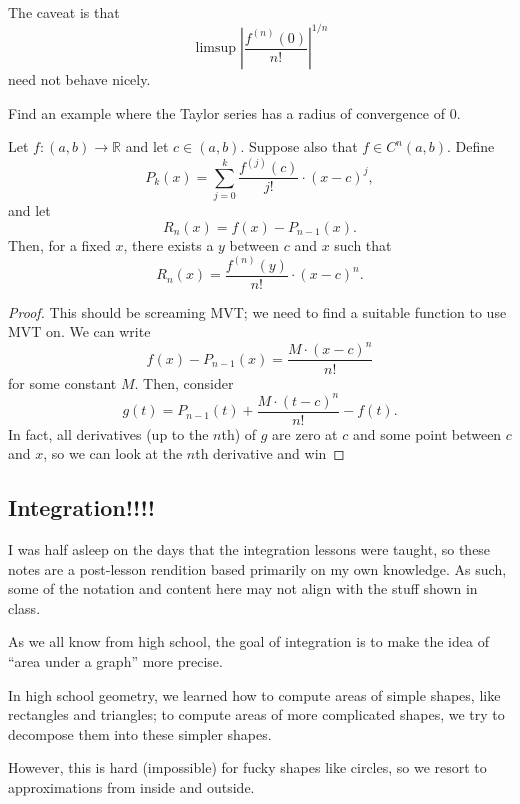 \documentclass[10pt]{scrartcl}
\providecommand{\RR}{\mathbb R}
\providecommand{\abs}[1]{\left|{#1}\right|}
\begin{document}
The caveat is that
\[\limsup\abs{\frac{f^{(n)}(0)}{n!}}^{1/n}\]
need not behave nicely.

\begin{exercise}
	Find an example where the Taylor series
	has a radius of convergence of $0$.
\end{exercise}

\begin{lemma}
	Let $f\colon(a, b)\to\RR$ and let $c\in(a, b)$.
	Suppose also that $f\in C^n(a, b)$. Define
	\[P_k(x) = \sum_{j=0}^k \frac{f^{(j)}(c)}{j!}\cdot (x-c)^j,\]
	and let
	\[R_n(x) = f(x) - P_{n-1}(x).\]
	Then, for a fixed $x$, there exists a $y$ between $c$ and $x$ such that
	\[R_n(x) = \frac{f^{(n)}(y)}{n!}\cdot (x-c)^n.\]
\end{lemma}

\begin{proof}
	This should be screaming MVT; we need to find
	a suitable function to use MVT on.
	We can write
	\[f(x) - P_{n-1}(x) = \frac{M\cdot (x-c)^n}{n!}\]
	for some constant $M$. Then, consider
	\[g(t) = P_{n-1}(t) + \frac{M\cdot(t-c)^n}{n!} - f(t).\]
	In fact, all derivatives (up to the $n$th) of $g$ are
	zero at $c$ and some point between $c$ and $x$,
	so we can look at the $n$th derivative and win 
\end{proof}

\subsection{Integration!!!!}

\begin{warning*}
	I was half asleep on the days that the integration lessons were taught,
	so these notes are a post-lesson rendition based primarily on
	my own knowledge. As such, some of the notation and content here
	may not align with the stuff shown in class.
\end{warning*}

As we all know from high school, the goal of integration is to
make the idea of ``area under a graph'' more precise.

In high school geometry, we learned how to compute areas of simple shapes,
like rectangles and triangles; to compute areas of more complicated shapes,
we try to decompose them into these simpler shapes.


However, this is hard (impossible) for fucky shapes like circles,
so we resort to approximations from inside and outside.
\end{document}
